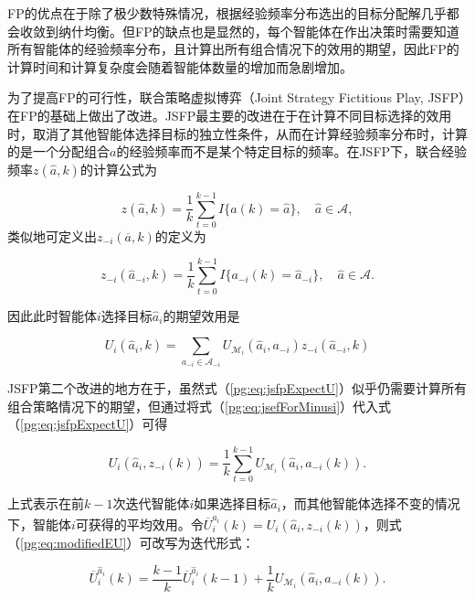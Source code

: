 FP的优点在于除了极少数特殊情况，根据经验频率分布选出的目标分配解几乎都会收敛到纳什均衡。但FP的缺点也是显然的，每个智能体在作出决策时需要知道所有智能体的经验频率分布，且计算出所有组合情况下的效用的期望，因此FP的计算时间和计算复杂度会随着智能体数量的增加而急剧增加。

为了提高FP的可行性，联合策略虚拟博弈（Joint Strategy Fictitious Play, JSFP）在FP的基础上做出了改进。JSFP最主要的改进在于在计算不同目标选择的效用时，取消了其他智能体选择目标的独立性条件，从而在计算经验频率分布时，计算的是一个分配组合$a$的经验频率而不是某个特定目标的频率。在JSFP下，联合经验频率$z(\hat a,k)$的计算公式为

\begin{equation}
\label{pg:eq:jsef}
	z(\hat a,k) = \frac{1}{k} \sum_{t=0}^{k-1} I\{a(k) = \hat a\},\quad \hat a \in \mathcal{A},
\end{equation}
类似地可定义出$z_{-i}(\overline a,k)$的定义为

\begin{equation}
\label{pg:eq:jsefForMinusi}
	z_{-i}(\hat a_{-i},k) = \frac{1}{k} \sum_{t=0}^{k-1} I\{a_{-i}(k) = \hat a_{-i}\},\quad \hat a \in \mathcal{A}.
\end{equation}

因此此时智能体$i$选择目标$\hat a_i$的期望效用是

\begin{equation}
\label{pg:eq:jsfpExpectU}
	U_i(\hat a_i,k) = \sum_{a_{-i} \in \mathcal{A}_{-i}} U_{\mathcal{M}_i}(\hat a_i,a_{-i}) z_{-i}(\hat a_{-i},k)
\end{equation}

JSFP第二个改进的地方在于，虽然式（\ref{pg:eq:jsfpExpectU}）似乎仍需要计算所有组合策略情况下的期望，但通过将式（\ref{pg:eq:jsefForMinusi}）代入式（\ref{pg:eq:jsfpExpectU}）可得

\begin{equation}
\label{pg:eq:modifiedEU}
	U_i(\hat a_i, z_{-i}(k)) = \frac{1}{k}\sum_{t=0}^{k-1} U_{\mathcal{M}_i}(\hat a_i, a_{-i}(k)).
\end{equation}

上式表示在前$k-1$次迭代智能体$i$如果选择目标$\hat a_i$，而其他智能体选择不变的情况下，智能体$i$可获得的平均效用。令$\overline U_i^{\hat a_i}(k)=U_i(\hat a_i, z_{-i}(k))$，则式（\ref{pg:eq:modifiedEU}）可改写为迭代形式：

\begin{equation}
\label{pg:eq:recurJSFP}
	\overline U_i^{\hat a_i}(k) = \frac{k-1}{k} \overline U_i^{\hat a_i}(k-1) + \frac{1}{k} U_{\mathcal{M}_i}(\hat a_i, a_{-i}(k)).
\end{equation}

